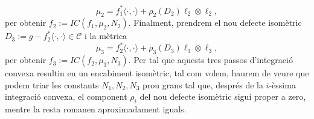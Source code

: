 \begin{equation*}
    \mu_2 = f_1^*\langle\cdot, \cdot\rangle + \rho_2(D_2)\ell_2\otimes\ell_2,
\end{equation*}
 per obtenir $f_2:=IC(f_1, \mu_2, N_2)$. Finalment, prendrem el nou defecte isomètric $D_3 := g-f_2^*\langle\cdot, \cdot\rangle\in\mathcal C$ i la mètrica
\begin{equation*}
    \mu_3 = f_2^*\langle\cdot, \cdot\rangle + \rho_3(D_3)\ell_3\otimes\ell_3,
\end{equation*}
per obtenir $f_3:=IC(f_2, \mu_3, N_3)$. Per tal que aquests tres passos d'integració convexa resultin en un encabiment isomètric, tal com volem, haurem de veure que podem triar les constants $N_1, N_2, N_3$ prou grans tal que, després de la $i$-èssima integració convexa, el component $\rho_i$ del nou defecte isomètric sigui proper a zero, mentre la resta romanen aproximadament iguals. 